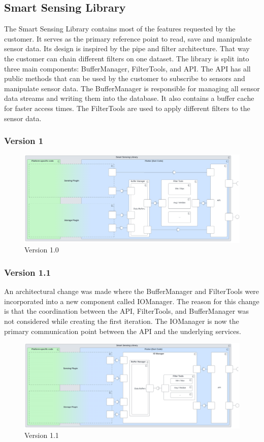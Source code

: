 \documentclass[12pt]{article}
\begin{document}
\subsection{Smart Sensing Library}
The Smart Sensing Library contains most of the features requested by the customer. It serves as the primary reference point to read, save and manipulate sensor data. Its design is inspired by the pipe and filter architecture. That way the customer can chain different filters on one dataset. The library is split into three main components: BufferManager, FilterTools, and API. The API has all public methods that can be used by the customer to subscribe to sensors and manipulate sensor data. The BufferManager is responsible for managing all sensor data streams and writing them into the database. It also contains a buffer cache for faster access times. The FilterTools are used to apply different filters to the sensor data.

\subsubsection{Version 1}
\begin{figure}[ht]
\includegraphics[width=1\textwidth]{Graphics/SmartSensingLibraryOld.png}
\caption{\label{fig:bild1}Version 1.0}
\end{figure}
\subsubsection{Version 1.1}
An architectural change was made where the BufferManager and FilterTools were incorporated into a new component called IOManager.
The reason for this change is that the coordination between the API, FilterTools, and BufferManager was not considered while creating the first iteration. The IOManager is now the primary communication point between the API and the underlying services.
\begin{figure}[ht]
\includegraphics[width=1\textwidth]{Graphics/SmartSensingLibraryNew.png}
\caption{\label{fig:bild2} Version 1.1}
\end{figure}
\newpage
\end{document}
